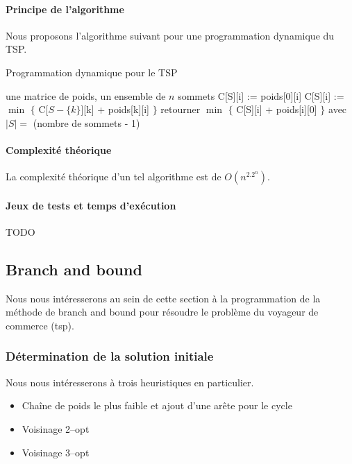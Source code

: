 \documentclass[a4paper, 12pt]{article}
\begin{document}
\paragraph{Principe de l'algorithme}

Nous proposons l'algorithme suivant pour une programmation dynamique
du TSP.

\begin{algorithm}[!ht]
\caption{Programmation dynamique pour le TSP}
\label{Dyntsp}
\begin{algorithmic}[1]
\REQUIRE une matrice de poids, un ensemble de $n$ sommets
\STATE C[S][i] := poids[0][i]
\ENDFOR
\ELSE
{}
\STATE C[S][i] := $\min$ $\{$ C[$S - \{ k \} $][k] + poids[k][i] $\}$
\ENDFOR
\ENDFOR
\ENDIF
\ENDFOR
\STATE retourner $\min$ $\{$ C[S][i] + poids[i][0] $\}$ avec $|S| = $
(nombre de sommets - 1)
\end{algorithmic}
\end{algorithm}

\paragraph{Complexité théorique}

La complexité théorique d'un tel algorithme est de $O(n^2.2^n)$.

\paragraph{Jeux de tests et temps d'exécution}

TODO


\pagebreak

\subsection{Branch and bound}

Nous nous intéresserons au sein de cette section à la programmation de
la méthode de branch and bound pour résoudre le problème du voyageur
de commerce (tsp).

\subsubsection{Détermination de la solution initiale}

 Nous nous intéresserons à trois heuristiques en particulier.
\begin{itemize}
\item Chaîne de poids le plus faible et ajout d'une arête pour le
  cycle
\item Voisinage 2--opt
\item Voisinage 3--opt
\end{itemize}
\end{document}
